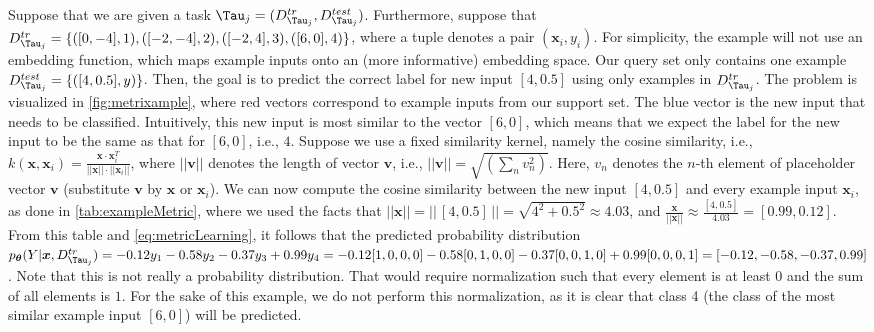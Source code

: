 Suppose that we are given a task $\Tau_{j} = (D^{tr}_{\Tau_{j}}, D^{test}_{\Tau_{j}})$. Furthermore, suppose that $D^{tr}_{\Tau_{j}} = \{ ([0,-4], 1), ([-2,-4],2), ([-2,4],3), ([6,0], 4) \}$, where a tuple denotes a pair $(\boldsymbol{x}_{i},y_{i})$. For simplicity, the example will not use an embedding function, which maps example inputs onto an (more informative) embedding space. Our query set only contains one example $D^{test}_{\Tau_{j}} = \{ ([4, 0.5], y) \}$. Then, the goal is to predict the correct label for new input $[4, 0.5]$ using only examples in $D^{tr}_{\Tau_{j}}$. The problem is visualized in \autoref{fig:metrixample}, where red vectors correspond to example inputs from our support set. The blue vector is the new input that needs to be classified. Intuitively, this new input is most similar to the vector $[6,0]$, which means that we expect the label for the new input to be the same as that for $[6,0]$, i.e., $4$. 
Suppose we use a fixed similarity kernel, namely the cosine similarity, i.e.,
$k(\boldsymbol{x}, \boldsymbol{x}_{i}) = \frac{\boldsymbol{x} \cdot \boldsymbol{x}_{i}^{T}}{||\boldsymbol{x}|| \cdot ||\boldsymbol{x}_{i}||}$, where $||\boldsymbol{v}||$ denotes the length of vector $\boldsymbol{v}$, i.e., $||\boldsymbol{v}|| = \sqrt{(\sum_{n}v_{n}^{2})}$. Here, $v_{n}$ denotes the $n$-th element of placeholder vector $\boldsymbol{v}$ (substitute $\boldsymbol{v}$ by $\boldsymbol{x}$ or $\boldsymbol{x}_{i}$). We can now compute the cosine similarity between the new input $[4,0.5]$ and every example input $\boldsymbol{x}_{i}$, as done in \autoref{tab:exampleMetric}, where we used the facts that $||\boldsymbol{x}|| = ||\, [4,0.5] \, || = \sqrt{4^{2}+0.5^{2}} \approx 4.03$, and $\frac{\boldsymbol{x}}{||\boldsymbol{x}||} \approx \frac{[4,0.5]}{4.03} = [0.99,0.12]$. 
From this table and \autoref{eq:metricLearning}, it follows that the predicted probability distribution $p_{\boldsymbol{\theta}}(Y|\boldsymbol{x}, D^{tr}_{\Tau_{j}}) = -0.12y_{1} -0.58y_{2} - 0.37y_{3} + 0.99y_{4} = -0.12 [1,0,0,0] - 0.58 [0,1,0,0] -0.37[0,0,1,0] + 0.99[0,0,0,1] =\allowbreak [-0.12,\allowbreak -0.58,\allowbreak -0.37,\allowbreak 0.99]$. Note that this is not really a probability distribution. That would require normalization such that every element is at least $0$ and the sum of all elements is $1$. For the sake of this example, we do not perform this normalization, as it is clear that class 4 (the class of the most similar example input $[6,0]$) will be predicted. 
